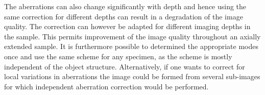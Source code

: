 The aberrations can also change significantly with depth and hence using the same correction for different depths can result in a degradation of the image quality.  The correction can however be adapted for different imaging depths in the sample. This permits improvement of the image quality throughout an axially extended sample. It is furthermore possible to determined the appropriate modes once and use the same scheme for any specimen, as the scheme is mostly independent of the object structure. Alternatively, if one wants to correct for local variations in aberrations the image could be formed from several sub-images for which independent aberration correction would be performed.